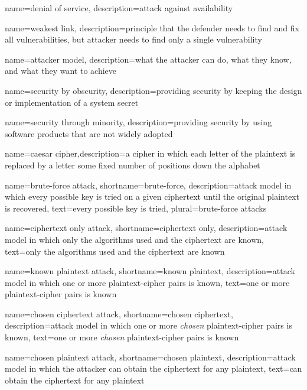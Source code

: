 {
    name={denial of service},
    description={attack against availability}
}

{
    name={weakest link},
    description={principle that the defender needs to find and fix all vulnerabilities, but attacker needs to find only a single vulnerability}
}

{
    name={attacker model},
    description={what the attacker can do, what they know, and what they want to achieve}
}

{
    name={security by obscurity},
    description={providing security by keeping the design or implementation of a system secret}
}

{
    name={security through minority},
    description={providing security by using software products that are not widely adopted}
}

{
    name={caesar cipher},description={a cipher in which each letter of the plaintext is replaced by a letter some fixed number of positions down the alphabet}
}

{
    name={brute-force attack},
    shortname={brute-force},
    description={attack model in which every possible key is tried on a given ciphertext until the original plaintext is recovered},
    text={every possible key is tried},
    plural={brute-force attacks}
}

{
    name={ciphertext only attack},
    shortname={ciphertext only},
    description={attack model in which only the algorithms used and the ciphertext are known},
    text={only the algorithms used and the ciphertext are known}
}

{
    name={known plaintext attack},
    shortname={known plaintext},
    description={attack model in which one or more plaintext-cipher pairs is known},
    text={one or more plaintext-cipher pairs is known}
}

{
    name={chosen ciphertext attack},
    shortname={chosen ciphertext},
    description={attack model in which one or more \emph{chosen} plaintext-cipher pairs is known},
    text={one or more \emph{chosen} plaintext-cipher pairs is known}
}

{
    name={chosen plaintext attack},
    shortname={chosen plaintext},
    description={attack model in which the attacker can obtain the ciphertext for any plaintext},
    text={can obtain the ciphertext for any plaintext}
}

